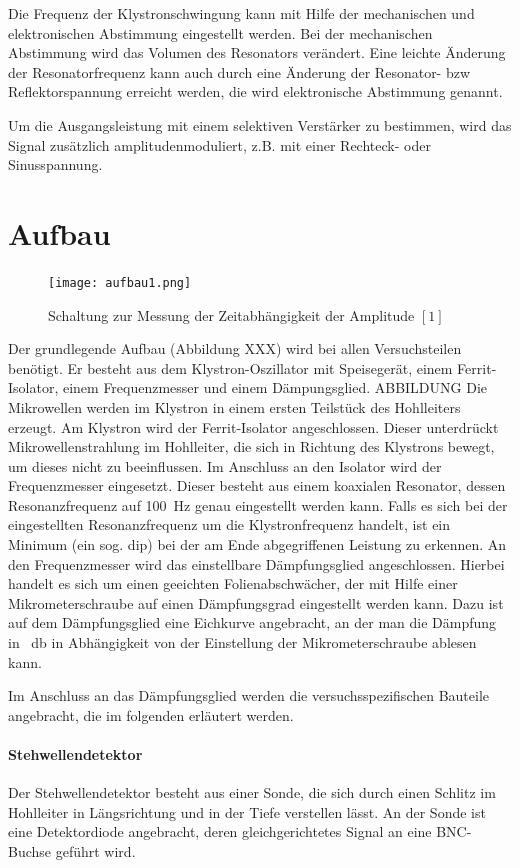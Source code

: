 \documentclass[a4paper]{article}
\begin{document}
\noindent
Die Frequenz der Klystronschwingung kann mit Hilfe der mechanischen und elektronischen Abstimmung eingestellt werden. Bei der mechanischen Abstimmung wird das Volumen des Resonators verändert. Eine leichte Änderung der Resonatorfrequenz kann auch durch eine Änderung der Resonator- bzw Reflektorspannung erreicht werden, die wird elektronische Abstimmung genannt.

\noindent
Um die Ausgangsleistung mit einem selektiven Verstärker zu bestimmen, wird das Signal zusätzlich amplitudenmoduliert, z.B. mit einer Rechteck- oder Sinusspannung.

\section{Aufbau}
\begin{figure}[h]
\centering
\texttt{[image: aufbau1.png]}
\caption{Schaltung zur Messung der Zeitabhängigkeit der Amplitude $[1]$}
\label{S1}
\end{figure}
Der grundlegende Aufbau (Abbildung XXX) wird bei allen Versuchsteilen benötigt. Er besteht aus dem Klystron-Oszillator mit Speisegerät, einem Ferrit-Isolator, einem Frequenzmesser und einem Dämpungsglied.
ABBILDUNG
Die Mikrowellen werden im Klystron in einem ersten Teilstück des Hohlleiters erzeugt. Am Klystron wird der Ferrit-Isolator angeschlossen. Dieser unterdrückt Mikrowellenstrahlung im Hohlleiter, die sich in Richtung des Klystrons bewegt, um dieses nicht zu beeinflussen. Im Anschluss an den Isolator wird der Frequenzmesser eingesetzt. Dieser besteht aus einem koaxialen Resonator, dessen Resonanzfrequenz auf \SI{100}{\hertz} genau eingestellt werden kann. Falls es sich bei der eingestellten Resonanzfrequenz um die Klystronfrequenz handelt, ist ein Minimum (ein sog. dip) bei der am Ende abgegriffenen Leistung zu erkennen. An den Frequenzmesser wird das einstellbare Dämpfungsglied angeschlossen. Hierbei handelt es sich um einen geeichten Folienabschwächer, der mit Hilfe einer Mikrometerschraube auf einen Dämpfungsgrad eingestellt werden kann. Dazu ist auf dem Dämpfungsglied eine Eichkurve angebracht, an der man die Dämpfung in \SI{}{\decibel} in Abhängigkeit von der Einstellung der Mikrometerschraube ablesen kann.

\noindent
Im Anschluss an das Dämpfungsglied werden die versuchsspezifischen Bauteile angebracht, die im folgenden erläutert werden.
\paragraph{Stehwellendetektor}
Der Stehwellendetektor besteht aus einer Sonde, die sich durch einen Schlitz im Hohlleiter in Längsrichtung und in der Tiefe verstellen lässt. An der Sonde ist eine Detektordiode angebracht, deren gleichgerichtetes Signal an eine BNC-Buchse geführt wird.
\end{document}
